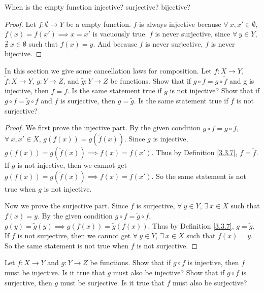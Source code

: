 \begin{exercise}\label{ex 3.3.3}
When is the empty function injective?
surjective?
bijective?
\end{exercise}

\begin{proof}
Let \(f : \emptyset \to Y\) be a empty function.
\(f\) is always injective because \(\forall\ x, x' \in \emptyset\), \(f(x) = f(x') \implies x = x'\) is vacuously true.
\(f\) is never surjective, since \(\forall\ y \in Y\), \(\nexists\ x \in \emptyset\) such that \(f(x) = y\).
And because \(f\) is never surjective, \(f\) is never bijective.
\end{proof}

\begin{exercise}\label{ex 3.3.4}
In this section we give some cancellation laws for composition.
Let \(f : X \to Y\), \(\tilde{f} : X \to Y\), \(g : Y \to Z\), and \(\tilde{g} : Y \to Z\) be functions.
Show that if \(g \circ f = g \circ \tilde{f}\) and g is injective, then \(f = \tilde{f}\).
Is the same statement true if \(g\) is not injective?
Show that if \(g \circ f = \tilde{g} \circ f\) and \(f\) is surjective, then \(g = \tilde{g}\).
Is the same statement true if \(f\) is not surjective?
\end{exercise}

\begin{proof}
We first prove the injective part.
By the given condition \(g \circ f = g \circ \tilde{f}\), \(\forall\ x, x' \in X\), \(g(f(x)) = g(\tilde{f}(x))\).
Since \(g\) is injective, \(g(f(x)) = g(\tilde{f}(x)) \implies f(x) = f(x')\).
Thus by Definition \ref{3.3.7}, \(f = \tilde{f}\).
If \(g\) is not injective, then we cannot get \(g(f(x)) = g(\tilde{f}(x)) \implies f(x) = f(x')\).
So the same statement is not true when \(g\) is not injective.

Now we prove the surjective part.
Since \(f\) is surjective, \(\forall\ y \in Y\), \(\exists\ x \in X\) such that \(f(x) = y\).
By the given condition \(g \circ f = \tilde{g} \circ f\), \(g(y) = \tilde{g}(y) \implies g(f(x)) = \tilde{g}(f(x))\).
Thus by Definition \ref{3.3.7}, \(g = \tilde{g}\).
If \(f\) is not surjective, then we cannot get \(\forall\ y \in Y\), \(\exists\ x \in X\) such that \(f(x) = y\).
So the same statement is not true when \(f\) is not surjective.
\end{proof}

\begin{exercise}\label{ex 3.3.5}
Let \(f : X \to Y\) and \(g : Y \to Z\) be functions.
Show that if \(g \circ f\) is injective, then \(f\) must be injective.
Is it true that \(g\) must also be injective?
Show that if \(g \circ f\) is surjective, then \(g\) must be surjective.
Is it true that \(f\) must also be surjective?
\end{exercise}

